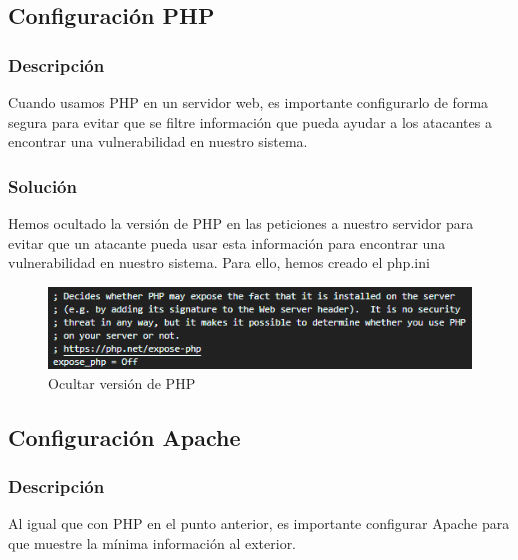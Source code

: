 \documentclass{report}
\begin{document}
            \subsection{Configuración PHP}
                \subsubsection{Descripción}
                    Cuando usamos PHP en un servidor web, es importante configurarlo de forma segura para evitar que se filtre información que pueda ayudar a los atacantes a encontrar una vulnerabilidad en nuestro sistema.
                \subsubsection{Solución}
                    Hemos ocultado la versión de PHP en las peticiones a nuestro servidor para evitar que un atacante pueda usar esta información para encontrar una vulnerabilidad en nuestro sistema. Para ello, hemos creado el php.ini
                    \begin{figure}[H]
                        \centering
                        \includegraphics[width=\textwidth]{./img/vulnerabilidades/3.5/14.1.png}
                        \caption{Ocultar versión de PHP}
                    \end{figure}
            \clearpage
            \subsection{Configuración Apache}
                \subsubsection{Descripción}
                    Al igual que con PHP en el punto anterior, es importante configurar Apache para que muestre la mínima información al exterior.
\end{document}
